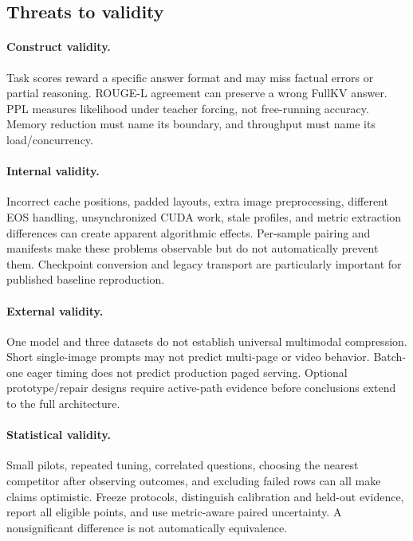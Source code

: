 \subsection{Threats to validity}
\paragraph{Construct validity.}
Task scores reward a specific answer format and may miss factual errors or
partial reasoning. ROUGE-L agreement can preserve a wrong FullKV answer. PPL
measures likelihood under teacher forcing, not free-running accuracy. Memory
reduction must name its boundary, and throughput must name its load/concurrency.

\paragraph{Internal validity.}
Incorrect cache positions, padded layouts, extra image preprocessing, different
EOS handling, unsynchronized CUDA work, stale profiles, and metric extraction
differences can create apparent algorithmic effects. Per-sample pairing and
manifests make these problems observable but do not automatically prevent them.
Checkpoint conversion and legacy transport are particularly important for
published baseline reproduction.

\paragraph{External validity.}
One model and three datasets do not establish universal multimodal compression.
Short single-image prompts may not predict multi-page or video behavior.
Batch-one eager timing does not predict production paged serving. Optional
prototype/repair designs require active-path evidence before conclusions extend
to the full architecture.

\paragraph{Statistical validity.}
Small pilots, repeated tuning, correlated questions, choosing the nearest
competitor after observing outcomes, and excluding failed rows can all make
claims optimistic. Freeze protocols, distinguish calibration and held-out
evidence, report all eligible points, and use metric-aware paired uncertainty.
A nonsignificant difference is not automatically equivalence.

